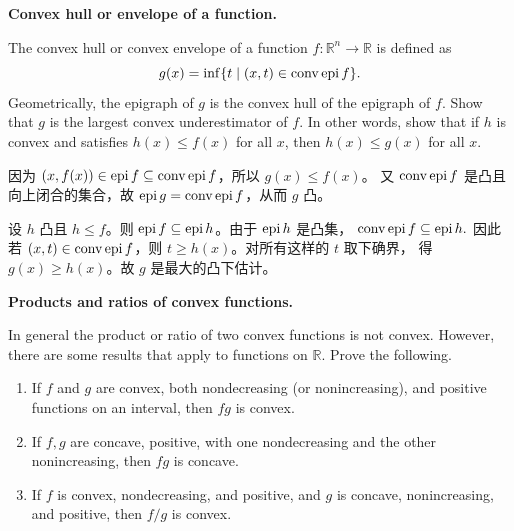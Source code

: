 \documentclass{ctexart}
\begin{document}
\begin{problem}\label{3.30}
  \textbf{Convex hull or envelope of a function.}

  The convex hull or convex envelope of a function $f:\mathbb{R}^n\to\mathbb{R}$ is defined as
  \[
    g(x)=\inf\{t\mid(x,t)\in\operatorname{conv}\operatorname{epi} f\}.
  \]
  Geometrically, the epigraph of $g$ is the convex hull of the epigraph of $f$.
  Show that $g$ is the largest convex underestimator of $f$. In other words, show
  that if $h$ is convex and satisfies $h(x)\leq f(x)$ for all $x$, then
  $h(x)\leq g(x)$ for all $x$.
\end{problem}

\begin{solution}
  因为 $(x,f(x))\in\operatorname{epi} f\subseteq\operatorname{conv}\operatorname{epi} f$，所以 $g(x)\leq f(x)$。
  又 $\operatorname{conv}\operatorname{epi} f$ 是凸且向上闭合的集合，故 $\operatorname{epi} g=\operatorname{conv}\operatorname{epi} f$，从而 $g$ 凸。

  设 $h$ 凸且 $h\leq f$。则 $\operatorname{epi} f\subseteq\operatorname{epi} h$。由于 $\operatorname{epi} h$ 是凸集，
  \(
    \operatorname{conv}\operatorname{epi} f\subseteq\operatorname{epi} h.
  \)
  因此若 $(x,t)\in\operatorname{conv}\operatorname{epi} f$，则 $t\geq h(x)$。对所有这样的 $t$ 取下确界，
  得 $g(x)\geq h(x)$。故 $g$ 是最大的凸下估计。
\end{solution}

\begin{problem}\label{3.32}
  \textbf{Products and ratios of convex functions.}

  In general the product or ratio of two convex functions is not convex.
  However, there are some results that apply to functions on $\mathbb{R}$. Prove the following.
  \begin{enumerate}
    \item If $f$ and $g$ are convex, both nondecreasing (or nonincreasing), and positive
      functions on an interval, then $fg$ is convex.

    \item If $f,g$ are concave, positive, with one nondecreasing and the other
      nonincreasing, then $fg$ is concave.

    \item If $f$ is convex, nondecreasing, and positive, and $g$ is concave,
      nonincreasing, and positive, then $f/g$ is convex.
  \end{enumerate}
\end{problem}
\end{document}
